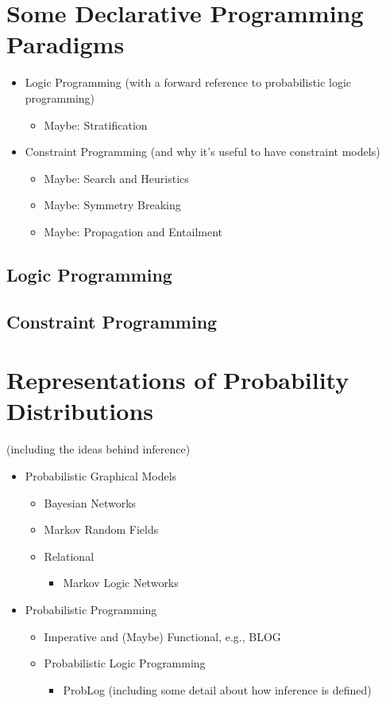 \section{Some Declarative Programming Paradigms}

\begin{itemize}
\item Logic Programming (with a forward reference to probabilistic logic programming)
  \begin{itemize}
  \item Maybe: Stratification
  \end{itemize}
\item Constraint Programming (and why it's useful to have constraint models)
  \begin{itemize}
  \item Maybe: Search and Heuristics
  \item Maybe: Symmetry Breaking
  \item Maybe: Propagation and Entailment
  \end{itemize}
\end{itemize}

\subsection{Logic Programming} \label{sec:lp}

\subsection{Constraint Programming} \label{sec:cp}

\section{Representations of Probability Distributions}

(including the ideas behind inference)
\begin{itemize}
\item Probabilistic Graphical Models
  \begin{itemize}
  \item Bayesian Networks
  \item Markov Random Fields
  \item Relational
    \begin{itemize}
    \item Markov Logic Networks
    \end{itemize}
  \end{itemize}
\item Probabilistic Programming
  \begin{itemize}
  \item Imperative and (Maybe) Functional, e.g., BLOG
  \item Probabilistic Logic Programming
    \begin{itemize}
    \item ProbLog (including some detail about how inference is defined)
    \end{itemize}
  \end{itemize}
\end{itemize}

